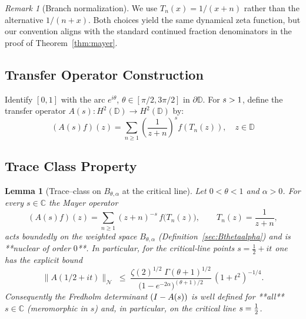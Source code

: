 \documentclass[11pt,a4paper]{article}
\newtheorem{lemma}[theorem]{Lemma}
\theoremstyle{definition}
\theoremstyle{remark}
\newtheorem{remark}[theorem]{Remark}
\newcommand{\C}{\mathbb{C}}
\let\det\relax
\DeclareMathOperator{\det}{det}   %
\let\Re\relax
\DeclareMathOperator{\Re}{Re}
\begin{document}
\begin{remark}[Branch normalization]
We use $T_n(x) = 1/(x+n)$ rather than the alternative $1/(n+x)$. Both choices
yield the same dynamical zeta function, but our convention aligns with the
standard continued fraction denominators in the proof of Theorem~\ref{thm:mayer}.
\end{remark}

\subsection{Transfer Operator Construction}

Identify $[0,1]$ with the arc $e^{i\theta}$, $\theta \in [\pi/2, 3\pi/2]$ in $\partial\mathbb{D}$.
For $\Re s > 1$, define the transfer operator $A(s): H^2(\mathbb{D}) \to H^2(\mathbb{D})$ by:
\[
(A(s)f)(z) = \sum_{n \geq 1} \left(\frac{1}{z+n}\right)^s f(T_n(z)), \quad z \in \mathbb{D}
\]

\subsection{Trace Class Property}

\begin{lemma}[Trace--class on $B_{\theta,\alpha}$ at the critical line]
\label{lem:weighted-traceclass}
Let $0<\theta<1$ and $\alpha>0$.  
For every $s\in\C$ the Mayer operator
\[
      (A(s)f)(z)=\sum_{n\ge1}(z+n)^{-s}\,f\!\bigl(T_n(z)\bigr),
      \qquad T_n(z)=\frac1{z+n},
\]
acts boundedly on the weighted space
$B_{\theta,\alpha}$ (Definition~\ref{sec:Bthetaalpha}) and is **nuclear of
order \(0\)**.  In particular, for the critical‑line points
$s=\tfrac12+it$ one has the explicit bound
\[
   \|A(1/2+it)\|_{\mathcal N}
      \;\le\;
      \frac{\zeta(2)^{1/2}\;\Gamma(\theta+1)^{1/2}}
           {\bigl(1-e^{-2\alpha}\bigr)^{(\theta+1)/2}}\,
      (1+t^{2})^{-1/4}.
\]
Consequently the Fredholm determinant
\(
     \det(I-A(s))
\)
is well defined for **all** $s\in\C$ (meromorphic in $s$) and, in
particular, on the critical line $\Re s=\tfrac12$.
\end{lemma}
\end{document}

